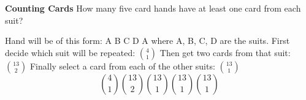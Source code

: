 \question \textbf{Counting Cards}\newline
How many five card hands have at least one card from each suit?
\begin{solution}
Hand will be of this form: A B C D A where A, B, C, D are the suits.
First decide which suit will be repeated: ${4 \choose 1}$
Then get two cards from that suit: ${13 \choose 2}$
Finally select a card from each of the other suits: ${13 \choose 1}$
\[{4 \choose 1} {13 \choose 2} {13 \choose 1} {13 \choose 1}  {13 \choose 1} \]
\end{solution}